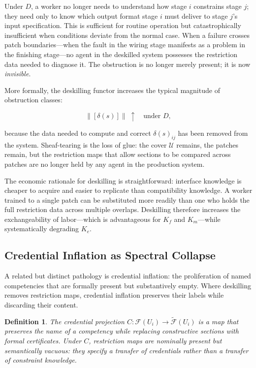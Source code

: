 \documentclass[12pt]{article}
\newtheorem{definition}{Definition}
\begin{document}
Under $D$, a worker no longer needs to understand how stage $i$ constrains stage $j$; they need only to know which output format stage $i$ must deliver to stage $j$'s input specification. This is sufficient for routine operation but catastrophically insufficient when conditions deviate from the normal case. When a failure crosses patch boundaries---when the fault in the wiring stage manifests as a problem in the finishing stage---no agent in the deskilled system possesses the restriction data needed to diagnose it. The obstruction is no longer merely present; it is now \emph{invisible}.

More formally, the deskilling functor increases the typical magnitude of obstruction classes:

\begin{equation}
\bigl\|[\delta(s)]\bigr\| \;\uparrow \quad \text{under } D,
\end{equation}

because the data needed to compute and correct $\delta(s)_{ij}$ has been removed from the system. Sheaf-tearing is the loss of glue: the cover $\mathcal{U}$ remains, the patches remain, but the restriction maps that allow sections to be compared across patches are no longer held by any agent in the production system.

The economic rationale for deskilling is straightforward: interface knowledge is cheaper to acquire and easier to replicate than compatibility knowledge. A worker trained to a single patch can be substituted more readily than one who holds the full restriction data across multiple overlaps. Deskilling therefore increases the exchangeability of labor---which is advantageous for $K_f$ and $K_m$---while systematically degrading $K_e$.

\subsection{Credential Inflation as Spectral Collapse}

A related but distinct pathology is credential inflation: the proliferation of named competencies that are formally present but substantively empty. Where deskilling removes restriction maps, credential inflation preserves their labels while discarding their content.

\begin{definition}
The \emph{credential projection} $C: \mathcal{F}(U_i) \to \tilde{\mathcal{F}}(U_i)$ is a map that preserves the name of a competency while replacing constructive sections with formal certificates. Under $C$, restriction maps are nominally present but semantically vacuous: they specify a transfer of credentials rather than a transfer of constraint knowledge.
\end{definition}
\end{document}
